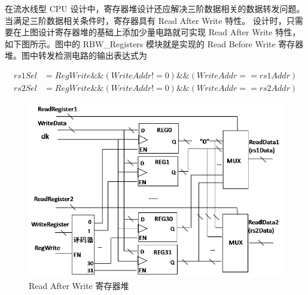 \documentclass[12pt,hyperref,a4paper,UTF8]{ctexart}
\begin{document}
在流水线型 CPU 设计中，寄存器堆设计还应解决三阶数据相关的数据转发问题。
当满足三阶数据相关条件时，寄存器具有 Read After Write 特性。
设计时，只需要在上图设计寄存器堆的基础上添加少量电路就可实现 Read After Write 特性，
如下图所示。图中的 RBW\_Registers 模块就是实现的 Read Before Write 寄存器堆。图中转发检测电路的输出表达式为

\begin{align*}
rs1Sel &= RegWrite \&\& (WriteAddr != 0) \&\& (WriteAddr == rs1Addr)  \\
rs2Sel &= RegWrite \&\& (WriteAddr != 0) \&\& (WriteAddr == rs2Addr) 
\end{align*}

    \begin{figure}[H]
        \centering
        \includegraphics[width=1\textwidth]{figures/fig/image5.png}
        \caption{Read After Write 寄存器堆}
    \end{figure}

\newpage
\end{document}

